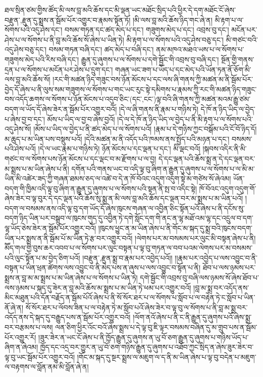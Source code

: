 ཐལ་སྲིན་ཙམ་གྱིས་ཚོད་མི་ལས་བླ་མའི་ཆོས་དང་མི་ལྡན་ཡང་མཐོང་སྲིད་པའི་ཕྱིར་དེ་དག་མཐོང་ངོ་ཞེས་{བརྫུན་,རྫུན་}དུ་སྨྲས་ན་སྦོམ་པོར་འགྱུར་བ་རྣམས་སྟོན་ཏོ། །མི་ལས་བླ་མའི་ཆོས་ཉིད་གང་ཞེ་ན། མི་རྟག་པ་ལ་སོགས་པའི་འདུ་ཤེས་དང་། བསམ་གཏན་དང་ཚད་མེད་པ་དང་། གཟུགས་མེད་པ་དང་། འབྲས་བུ་དང་། མངོན་པར་ཤེས་པ་ལ་སོགས་པ་ནི་བླ་མའི་ཆོས་སོ་ཞེས་པ་ཡིན་ཏེ། མི་རྟག་པ་ལ་སོགས་པའི་འདུ་ཤེས་བཅུ་དང་། མི་གཙང་བའི་འདུ་ཤེས་བཅུ་དང་། བསམ་གཏན་བཞི་དང་། ཚད་མེད་པ་བཞི་དང་། ནམ་མཁའ་མཐའ་ཡས་པ་ལ་སོགས་པ་གཟུགས་མེད་པའི་རིས་བཞི་དང་། རྒྱུན་དུ་ཞུགས་པ་ལ་སོགས་པ་དགེ་སྦྱོང་གི་འབྲས་བུ་བཞི་དང་། སྔོན་གྱི་གནས་དྲན་པ་ལ་སོགས་པ་མངོན་པར་ཤེས་པ་དྲུག་དང་། གཞན་ཡང་ཟག་པ་ཡོད་པ་དང་མེད་པའི་ཡོན་ཏན་ནོ་ཅོག་མི་ལས་བླ་མའི་ཆོས་སོ། །རང་གི་མཚན་ཉིད་གཟུང་བས་ཉོན་མོངས་པ་དང་ལས་ཞི་གནས་ཀྱི་མཚན་མ་ནི་སྦོམ་པོར་བྱེད་དོ་ཞེས་པ་ནི་ལུས་སམ་གཟུགས་ལ་སོགས་པ་གང་ཡང་རུང་སྟེ་དམིགས་པ་རྣམས་ཀྱི་རང་གི་མཚན་ཉིད་གཟུང་བས་འདོད་ཆགས་ལ་སོགས་པ་ཉོན་མོངས་པ་འདུབ་ཅིང་(དང་‚ངང་)ལྟ་བའི་ཞི་གནས་ཀྱི་མཚན་མའམ་རྒྱུ་ཙམ་བདག་ལ་ཡོད་དོ་ཞེས་ཟེར་ན་སྦོམ་པོར་འགྱུར་བའོ། །དེ་ལ་ཞི་གནས་ནི་རྣམ་པ་གཉིས་ཏེ། དེ་ཁོ་ན་ཉིད་ཡིད་ལ་བྱེད་པ་ཞེས་བྱ་བ་དང་། མོས་པ་ཡིད་ལ་བྱ་བ་ཞེས་བྱའོ། །དེ་ལ་དེ་ཁོ་ན་ཉིད་ཡིད་ལ་བྱེད་པ་ནི་མི་རྟག་པ་ལ་སོགས་པའི་འདུ་ཤེས་སོ། །མོས་པ་ཡིད་ལ་བྱེད་པ་ནི་ཚད་མེད་པ་ལ་སོགས་པའོ། །རྣམ་པ་དེ་གཉིས་ཀྱང་བསྒོམ་པའི་ངོ་བོ་ཉིད་དོ། མ་ཆུད་པ་མ་ཡིན་པས་བསྡུས་པའོ། །དེའི་མཚན་མ་ནི་འདོད་པའི་ཁམས་ནས་སྤྱོད་པའི་མཉན་པ་དང་། བསམས་པའི་ཤེས་པའོ། །དེ་ལ་ཡང་རྣམ་པ་གཉིས་ཏེ། ཉོན་མོངས་པ་དང་ལྡན་པ་དང་། མི་ལྡང་བའོ། །སྐབས་འདིར་ནི་མི་གཙང་བ་ལ་སོགས་པས་ཉོན་མོངས་པ་དང་ལྡང་བ་མ་རྫོགས་པ་ལ་བྱ། དེ་དང་ལྡན་པའི་ཆོས་སྨྲ་ན་དེ་དང་ལྡན་བར་མ་སྨྲས་པ་མ་ཡིན་ཞེས་པ་ནི། དགོན་པའི་གནས་ཡང་བ་འདི་ལྟ་བུ་ཞིག་ན་རྒྱུན་དུ་ཞུགས་པ་ལ་སོགས་པ་ལ་མི་མ་ཡིན་མི་འཚེར་ཟད་ཀྱི་གཞན་ཐམས་ཅད་ལ་འཚེ་བ་དེ་ན་ཁོ་བོའང་འདུག་འདུག་སྟེ་མ་གཙེས་སོ་ཞེའམ། ཡོན་བདག་གི་ཁྱིམ་འདི་ལྟ་བུ་ཞིག་ན་རྒྱུན་དུ་ཞུགས་པ་ལ་སོགས་པའི་སྟན་ནི་སྤ་བ་འདིང་སྟེ། ཁོ་བོའང་འདུག་འདུག་གོ་ཞེས་ཟེར་བ་ལྟ་བུར་དེ་དང་ལྡན་པའི་ཆོས་སུ་སྨྲ་ན་མི་ལས་བླ་མའི་ཆོས་དང་ལྡན་བར་མ་སྨྲས་པ་མ་ཡིན་པའོ། །བདག་ལ་བསམས་ནས་འདི་ལྟ་བུ་དག་ཡོད་དོ་ཞེས་ཁུངས་གཞན་ལ་འབྱིན་ཅིང་སྟོན་པའོ་ཞེས་པ་ནི་དངོས་སུ་བདག་ཉིད་ཡིན་པར་བསྒྲུབ་ལ་ཁུངས་གུད་དུ་འབྱིན་ཏེ་དགེ་སློང་དག་གི་ནང་ན་ལྷ་མཐོ་འམ་ལྷ་དང་འདྲུལ་བ་དག་ལྷ་ཡོད་ཅེས་ཟེར་ན་སྦོམ་པོར་འགྱུར་བའོ། །ཁུངས་ཕྱུང་ན་མ་ཡིན་ཞེས་པ་ནི་གོང་མ་སྐད་དུ་སྨྲ་བའི་ཁུངས་བདག་ཡིན་པར་སྨྲས་ན་ནི་སྦོམ་པོ་མ་ཡིན་ཏེ་རྩ་བར་འགྱུར་བའོ། །ལེགས་པར་མ་བསམས་པར་ལུང་མི་བསྟན་ཞེས་པ་ནི། མཽད་གལ་གྱི་བུས་ཆར་འབབ་པ་ལ་སོགས་པར་ལུང་བསྟན་པ་ལྟ་བུ་གཏན་ལ་བབ་པའམ་ལེགས་པར་མ་བསམས་པའི་ལུང་སྟོན་པ་མ་བྱེད་ཅིག་པའོ། །{བརྫུན་,རྫུན་}སྨྲ་བ་རྣམ་པར་འབྱེད་པའོ།། །།རྣམ་པར་འབྱེད་པ་ལས་འབྱུང་བ་ནི་བསྟན་པ་ཡིན་ཕྲན་ཚེགས་ལས་འབྱུང་བ་ནི་མེད་པས་ན་ཞུས་པ་ལས་འབྱུང་བ་སྟོན་པ་ནི། ཐོབ་པ་ལས་ཉམས་པར་སྨྲས་ན་བླ་མ་མ་སྨྲས་པ་མ་ཡིན་ཞེས་པ་ལ་སོགས་པ་ཡིན་ཏེ། དགེ་སྦྱོང་གི་འབྲས་བུ་བཞི་ལས་ཉམས་སོ་ཞེས་ཐོབ་པ་ལས་ཉམས་པ་སྐད་དུ་ཟེར་ན་བླ་མའི་ཆོས་མ་སྨྲས་པ་མ་ཡིན་ཏེ་ཕམ་པར་འགྱུར་བའོ། །བླ་མ་སྨྲ་བར་འདོད་ནས་མིང་མཐུན་པའི་དོན་བརྗོད་ན་སྦོམ་པོའོ་ཞེས་པ་ནི་སོ་སོར་ཐར་པ་ལ་སོགས་པ་སློབ་པ་ལ་བརྟེན་ཏེ་ང་སློབ་པ་ཡིན་ནོ་ཞེ་ན། སོ་སོར་ཐར་པ་ལོབས་ཟིན་པ་ལ་བརྟེན་ཏེ་མ་སློབ་པའོ་ཞེས་ཟེར་བ་ལྟ་བུ་ལ་སོགས་པ་ནི་བླ་མ་སྨྲ་བར་འདོད་ནས་དེ་སྐད་དུ་བརྒྱུད་པས་ན་སྦོམ་པོར་འགྱུར་བའོ། །ལོག་ནའོ་ཞེས་པ་ནི་ང་ནི་རྒྱུན་དུ་ཞུགས་པའོ་ཞེས་སྨྲ་བར་བརྩམས་པ་ལས། ལན་ཅིག་ཕྱིར་འོང་བའོ་ཞེས་སྨྲས་པ་དེ་ལྟ་བུ་ཇི་ལྟར་བསམས་བཞིན་དུ་མ་གྲུབ་པས་ན་སྦོམ་པོར་འགྱུར་རོ། །ཟུར་ཟེར་ན་ཡང་ངོ་ཞེས་པ་ནི་ཁྱོད་རྒྱུན་དུ་ཞུགས་ན་ཡུ་བོ་ཅག་རྒྱུན་དུ་ཞུགས་པ་གཉིས་ཡོད་པ་ཞིག་ན་ཞེའམ། ཁྱོད་དང་འདྲ་བར་གྱུར་ན་ཡུ་བོ་ཅག་གཉིས་རྒྱུན་དུ་ཞུགས་པ་འཐོབ་ཀྱང་སྲིད་ན་ཞེས་ཟུར་ཟེར་བ་ལྟ་བུ་ཡང་སྦོམ་པོར་འགྱུར་བའོ། །གོང་མ་སྐད་དུ་སྔར་སྨྲས་ལ་མཇུག་ལ་ད་ནི་མ་ཡིན་ཞེས་པ་ལྟ་བུ་བདེན་པ་མཇུག་ལ་བརྟགས་ལ་བློན་ནམ་མི་བློན་ཞེ་ན། 